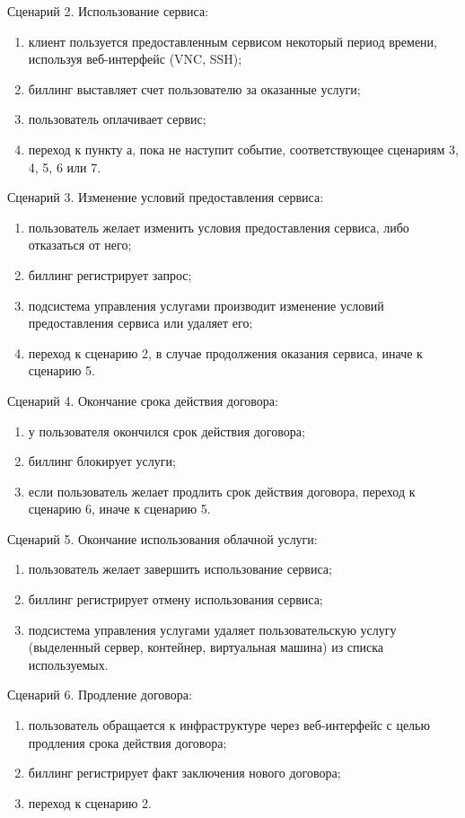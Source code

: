 Сценарий 2. Использование сервиса:
\begin{enumerate}
  \item клиент пользуется предоставленным сервисом некоторый период времени, используя веб-интерфейс (VNC, SSH);
  \item биллинг выставляет счет пользователю за оказанные услуги;
  \item пользователь оплачивает сервис;
  \item переход к пункту а, пока не наступит событие, соответствующее сценариям 3, 4, 5, 6 или 7.
\end{enumerate}

Сценарий 3. Изменение условий предоставления сервиса:
\begin{enumerate}
  \item пользователь желает изменить условия предоставления сервиса, либо отказаться от него;
  \item биллинг регистрирует запрос;
  \item подсистема управления услугами производит изменение условий предоставления сервиса или удаляет его;
  \item переход к сценарию 2, в случае продолжения оказания сервиса, иначе к сценарию 5.
\end{enumerate}

Сценарий 4. Окончание срока действия договора:
\begin{enumerate}
  \item у пользователя окончился срок действия договора;
  \item биллинг блокирует услуги;
  \item если пользователь желает продлить срок действия договора, переход к сценарию 6, иначе к сценарию 5.
\end{enumerate}

Сценарий 5. Окончание использования облачной услуги:
\begin{enumerate}
  \item пользователь желает завершить использование сервиса;
  \item биллинг регистрирует отмену использования сервиса;
  \item подсистема управления услугами удаляет пользовательскую услугу (выделенный сервер, контейнер, виртуальная машина) из списка используемых.
\end{enumerate}

Сценарий 6. Продление договора:
\begin{enumerate}
  \item пользователь обращается к инфраструктуре через веб-интерфейс с целью продления срока действия договора;
  \item биллинг регистрирует факт заключения нового договора;
  \item переход к сценарию 2.
\end{enumerate}

